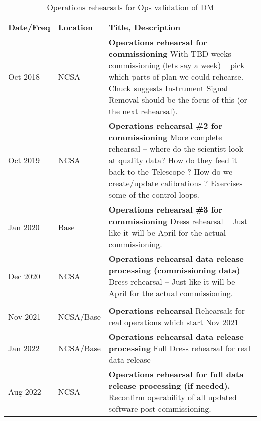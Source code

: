 \begin{longtable} {|l|l|p{}|}
	\caption{Operations rehearsals for Ops validation of DM \label{tab:ors}}\\  %
	\hline
\textbf{Date/Freq} &\textbf{Location}& \textbf{Title, Description} \\ \hline

Oct 2018 &  NCSA & \textbf{Operations rehearsal for commissioning }
	With TBD weeks commissioning (lets say a week) -- pick which parts of plan we could rehearse.
	Chuck suggests Instrument Signal Removal should be the focus of this (or the next rehearsal).
	\\ \hline
Oct 2019 & NCSA &  \textbf{Operations rehearsal \#2 for commissioning}
More complete rehearsal -- where do the scientist look at quality data? How do they feed it back to the Telescope ?
How do we create/update calibrations ? Exercises some of the control loops.
\\ \hline
Jan 2020 & Base  &  \textbf{Operations rehearsal \#3 for commissioning}
Dress rehearsal -- Just like it will be April for the actual commissioning.
	\\ \hline
Dec 2020 &  NCSA &  \textbf{Operations rehearsal data release processing (commissioning data)}
	Dress rehearsal -- Just like it will be April for the actual commissioning.
	\\ \hline

	\\ \hline

Nov 2021 &  NCSA/Base &  \textbf{Operations rehearsal}
Rehearsals for real operations which start  Nov 2021
	\\ \hline
Jan 2022 &  NCSA/Base &  \textbf{Operations rehearsal data release processing}
Full Dress rehearsal for real data release
	\\ \hline

Aug 2022 &  NCSA &  \textbf{Operations rehearsal for full data release processing (if needed).}
Reconfirm operability of all updated software post commissioning.
	\\ \hline

\end{longtable}
